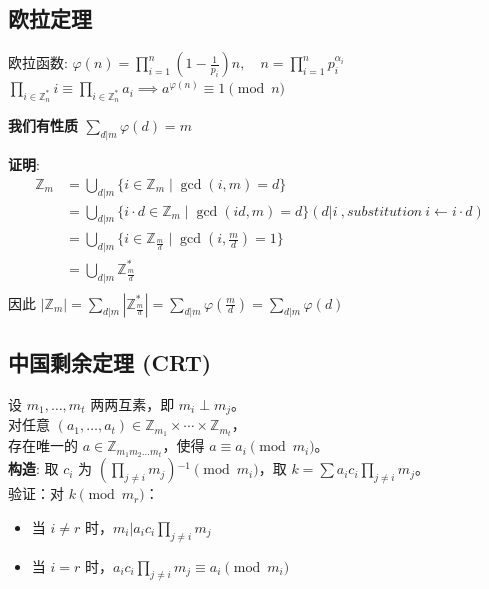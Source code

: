 \documentclass[12pt, a4paper]{article}
\begin{document}
\subsection*{欧拉定理}
欧拉函数: \(\varphi(n) = \prod\limits_{i=1}^n (1 - \frac{1}{p_i})n, \quad n = \prod\limits_{i=1}^n p_i^{\alpha_i}\) \\
\(\prod\limits_{i \in \mathbb{Z}_n^*} i \equiv \prod\limits_{i \in \mathbb{Z}_n^*} a_i \implies a^{\varphi(n)} \equiv 1 \pmod n\)

\textbf{我们有性质 \(\sum\limits_{d|m} \varphi(d) = m\)}

\begin{mdframed}
\textbf{证明}:
\begin{align*}
    \mathbb{Z}_m &= \bigcup\limits_{d|m} \{i \in \mathbb{Z}_m \mid \gcd(i,m)=d\} \\
    &= \bigcup\limits_{d|m} \{i \cdot d \in \mathbb{Z}_m \mid \gcd(id,m)=d\} (d|i \ ,substitution \ i \leftarrow i \cdot d)\\
    &= \bigcup\limits_{d|m} \{i \in \mathbb{Z}_{\frac{m}{d}} \mid \gcd(i, \frac{m}{d})=1\} \\
    &= \bigcup\limits_{d|m} \mathbb{Z}_{\frac{m}{d}}^* \\
\end{align*}
因此 \(|\mathbb{Z}_m| = \sum\limits_{d|m} |\mathbb{Z}_{\frac{m}{d}}^*| = \sum\limits_{d|m} \varphi(\frac{m}{d}) = \sum\limits_{d|m} \varphi(d)\)
\end{mdframed}

\subsection*{中国剩余定理 (CRT)}
设 \(m_1, \dots, m_t\) 两两互素，即 \(m_i \perp m_j\)。\\
对任意 \((a_1, \dots, a_t) \in \mathbb{Z}_{m_1} \times \cdots \times \mathbb{Z}_{m_t}\)，\\
存在唯一的 \(a \in \mathbb{Z}_{m_1 m_2 \dots m_t}\)，使得 \(a \equiv a_i \pmod{m_i}\)。\\
\textbf{构造}: 取 \(c_i\) 为 \((\prod\limits_{j \neq i} m_j){}^{-1} \pmod{m_i}\)，取 \(k = \sum a_i c_i \prod\limits_{j \neq i} m_j\)。\\
验证：对 \(k \pmod{m_r}\)：
\begin{itemize}
    \item 当 \(i \neq r\) 时，\(m_i | a_i c_i \prod\limits_{j \neq i} m_j\)
    \item 当 \(i = r\) 时，\(a_i c_i \prod\limits_{j \neq i} m_j \equiv a_i \pmod{m_i}\) \checkmark{}
\end{itemize}
\end{document}
